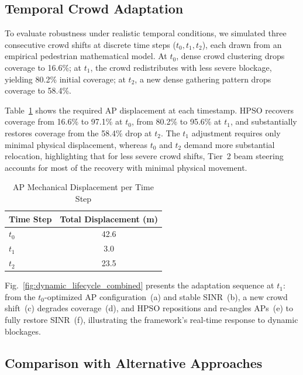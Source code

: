 \documentclass[conference]{IEEEtran}
\begin{document}
	\subsection{Temporal Crowd Adaptation}
	
	To evaluate robustness under realistic temporal conditions, we simulated three consecutive crowd shifts at discrete time steps ($t_0, t_1, t_2$), each drawn from an empirical pedestrian mathematical model. At $t_0$, dense crowd clustering drops coverage to 16.6\%; at $t_1$, the crowd redistributes with less severe blockage, yielding 80.2\% initial coverage; at $t_2$, a new dense gathering pattern drops coverage to 58.4\%.
	
	Table~\ref{tab:displacement_over_time} shows the required AP displacement at each timestamp. HPSO recovers coverage from 16.6\% to 97.1\% at $t_0$, from 80.2\% to 95.6\% at $t_1$, and substantially restores coverage from the 58.4\% drop at $t_2$. The $t_1$ adjustment requires only minimal physical displacement, whereas $t_0$ and $t_2$ demand more substantial relocation, highlighting that for less severe crowd shifts, Tier~2 beam steering accounts for most of the recovery with minimal physical movement.
	
	\begin{table}[t]
		\centering
		\caption{AP Mechanical Displacement per Time Step}
		\label{tab:displacement_over_time}
		\begin{tabular}{@{} l c @{}}
			\toprule
			\textbf{Time Step} & \textbf{Total Displacement (m)} \\
			\midrule
			$t_0$ & 42.6 \\
			$t_1$ & 3.0 \\
			$t_2$ & 23.5 \\
			\bottomrule
		\end{tabular}
		\vspace{-10pt}
	\end{table}
	
	Fig.~\ref{fig:dynamic_lifecycle_combined} presents the adaptation sequence at $t_1$: from the $t_0$-optimized AP configuration~(a) and stable SINR~(b), a new crowd shift~(c) degrades coverage~(d), and HPSO repositions and re-angles APs~(e) to fully restore SINR~(f), illustrating the framework's real-time response to dynamic blockages.
	
	
	
	
	\subsection{Comparison with Alternative Approaches}
	
\end{document}
